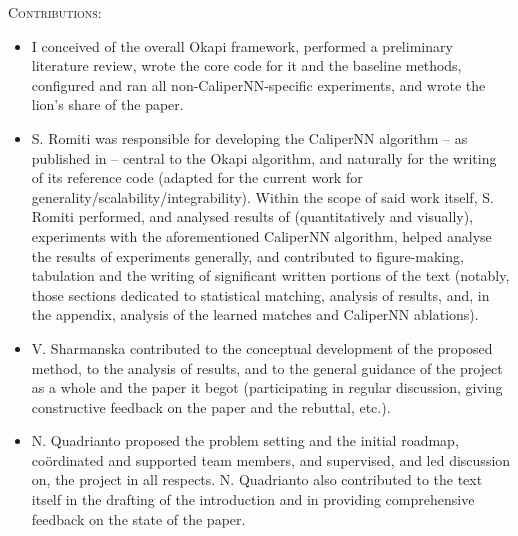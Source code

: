 \noindent\textsc{Contributions:}
%
\begin{itemize}
  \item 
    I conceived of the overall Okapi framework, performed a preliminary literature review, wrote
    the core code for it and the
    baseline methods, configured and ran all non-CaliperNN-specific experiments, and wrote the
    lion's share of the paper.
  \item 
    S. Romiti was responsible for developing the CaliperNN algorithm -- as published in
    \cite{RomInsShaQua22} -- central to the Okapi algorithm, and naturally for the writing of its
    reference code (adapted for the current work for generality/scalability/integrability).
    Within the scope of said work itself, S. Romiti performed, and analysed results of
    (quantitatively and visually), experiments with the aforementioned CaliperNN algorithm,  helped
    analyse the results of experiments generally, and contributed to figure-making, tabulation and
    the writing of significant written portions of the text (notably, those sections dedicated to
    statistical matching, analysis of results, and, in the appendix, analysis of the learned
    matches and CaliperNN ablations).
  \item 
    V. Sharmanska contributed to the conceptual development of the proposed method, to the analysis
    of results, and to the general guidance of the project as a whole and the paper it begot
    (participating in regular discussion, giving constructive feedback on the paper and the
    rebuttal, etc.).
  \item N. Quadrianto proposed the problem setting and the initial roadmap, co\"ordinated and
    supported team members, and supervised, and led discussion on, the project in all respects.
    N. Quadrianto also contributed to the text itself in the drafting of the introduction and in
    providing comprehensive feedback on the state of the paper.
\end{itemize}
